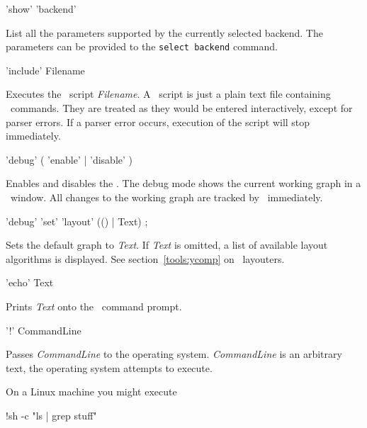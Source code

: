 \begin{rail}
  'show' 'backend'
\end{rail}\nopagebreak{}
List all the parameters supported by the currently selected backend. The parameters can be provided to the \texttt{select backend} command.

\begin{rail}
  'include' Filename
\end{rail}
Executes the \GrShell\ script \emph{Filename}. A \GrShell\ script is just a plain text file containing \GrShell\ commands. They are treated as they would be entered interactively, except for parser errors. If a parser error occurs, execution of the script will stop immediately.

\begin{rail}
  'debug' ( 'enable' | 'disable' )
\end{rail}
Enables and disables the . The debug mode shows the current working graph in a \yComp\ window. All changes to the working graph are tracked by \yComp\ immediately.  

\begin{rail}
  'debug' 'set' 'layout' (() | Text) ;
\end{rail}
Sets the default graph  to \emph{Text}. If \emph{Text} is omitted, a list of available layout algorithms is displayed. See section~\ref{tools:ycomp} on \yComp\ layouters.

\begin{rail}
  'echo' Text
\end{rail}
Prints \emph{Text} onto the \GrShell\ command prompt.

\begin{rail}
  '!' CommandLine
\end{rail}
Passes \emph{CommandLine} to the operating system. \emph{CommandLine} is an arbitrary text, the operating system attempts to execute.
\begin{example}
On a Linux machine you might execute
\begin{grshell}
!sh -c "ls | grep stuff"
\end{grshell}
\end{example}

